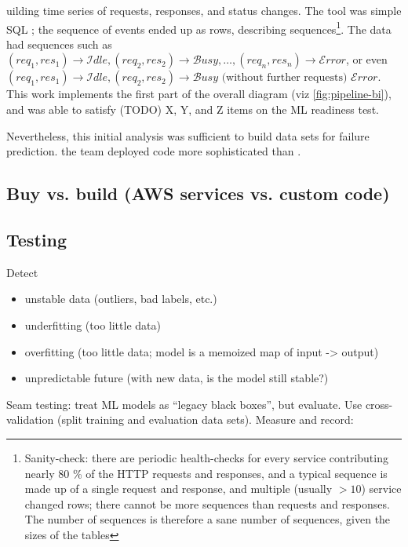 uilding time series of requests, responses, and status changes. The tool was simple SQL ; the sequence of events ended up as  rows, describing  sequences\footnote{Sanity-check: there are periodic health-checks for every service contributing nearly 80 \% of the HTTP requests and responses, and a typical sequence is made up of a single request and response, and multiple (usually $> 10$) service changed rows; there cannot be more sequences than requests and responses. The  number of sequences is therefore a sane number of sequences, given the sizes of the tables}. The data had sequences such as $(req_1, res_1) \rightarrow \mathcal{I}dle, (req_2, res_2) \rightarrow \mathcal{B}usy, \ldots, (req_n, res_n) \rightarrow \mathcal{E}rror$, or even $(req_1, res_1) \rightarrow \mathcal{I}dle, (req_2, res_2) \rightarrow \mathcal{B}usy\text{ (without further requests) } \mathcal{E}rror$. This work implements the first part of the overall diagram (viz \autoref{fig:pipeline-bi}), and was able to satisfy (TODO) X, Y, and Z items on the ML readiness test.


Nevertheless, this initial analysis was sufficient to build data sets for failure prediction.  the team deployed code more sophisticated than .

\subsection{Buy vs. build (AWS services vs. custom code)}


\subsection{Testing}
Detect
\begin{itemize}
  \item unstable data (outliers, bad labels, etc.)
  \item underfitting (too little data)
  \item overfitting (too little data; model is a memoized map of input -> output)
  \item unpredictable future (with new data, is the model still stable?)
\end{itemize}

Seam testing: treat ML models as ``legacy black boxes'', but evaluate. Use cross-validation (split training and evaluation data sets). Measure and record:


